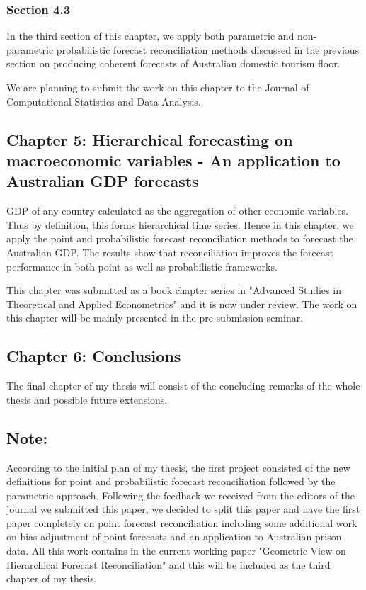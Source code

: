 \subsubsection*{Section 4.3}
In the third section of this chapter, we apply both parametric and non-parametric probabilistic forecast reconciliation methods discussed in the previous section on producing coherent forecasts of Australian domestic tourism floor.   

We are planning to submit the work on this chapter to the Journal of Computational Statistics and Data Analysis. 






\subsection*{Chapter 5: Hierarchical forecasting on macroeconomic variables - An application to Australian GDP forecasts}

GDP of any country calculated as the aggregation of other economic variables. Thus by definition, this forms hierarchical time series. Hence in this chapter, we apply the point and probabilistic forecast reconciliation methods to forecast the Australian GDP. The results show that reconciliation improves the forecast performance in both point as well as probabilistic frameworks. 

This chapter was submitted as a book chapter series in "Advanced Studies in Theoretical and Applied Econometrics" and it is now under review. The work on this chapter will be mainly presented in the pre-submission seminar.  


\subsection*{Chapter 6: Conclusions}

The final chapter of my thesis will consist of the concluding remarks of the whole thesis and possible future extensions.  

\subsection*{Note:} 
According to the initial plan of my thesis, the first project consisted of the new definitions for point and probabilistic forecast reconciliation followed by the parametric approach. Following the feedback we received from the editors of the journal we submitted this paper, we decided to split this paper and have the first paper completely on point forecast reconciliation including some additional work on bias adjustment of point forecasts and an application to Australian prison data. All this work contains in the current working paper "Geometric View on Hierarchical Forecast Reconciliation" and this will be included as the third chapter of my thesis.

